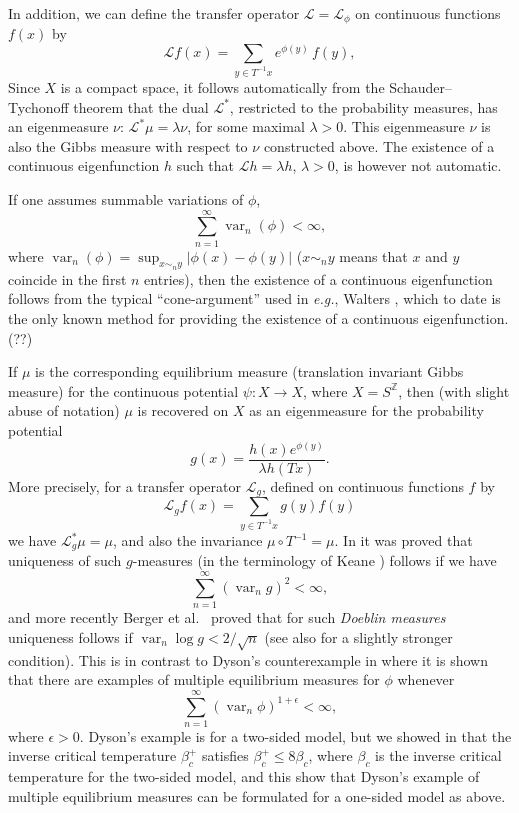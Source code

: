 \documentclass[11pt, a4paper]{amsart}
\theoremstyle{definition}
\theoremstyle{remark}
\providecommand{\mc}{\mathcal}
\providecommand{\opn}{\operatorname}
\providecommand{\var}{\opn{var}}
\def\X{X}
\begin{document}
In addition, we can define the transfer operator $\mc L=\mc L_\phi$ on
continuous functions $f(x)$ by
\begin{equation}\label{trans}
  {\mathcal L} f(x)= \sum_{y\in T^{-1}x} e^{\phi(y)}\, f(y),
\end{equation}
Since $\X$ is a compact space, it follows automatically from the
Schauder--Tychonoff theorem that the dual ${\mathcal L}^*$, restricted to the
probability measures, has an eigenmeasure $\nu$:
${\mathcal L}^* \mu=\lambda \nu$, for some maximal $\lambda>0$. This
eigenmeasure $\nu$ is also the Gibbs measure with respect to $\nu$ constructed
above. The existence of a continuous eigenfunction $h$ such that
${\mathcal L}h=\lambda h$, $\lambda>0$, is however not automatic.

If one assumes summable variations of $\phi$,
\begin{equation}\label{sum}
  \sum_{n=1}^\infty \var_n (\phi)<\infty,
\end{equation}
where $\var_n(\phi)=\sup_{x\sim_n y}|\phi(x)-\phi(y)|$ ($x\sim_n y$ means that
$x$ and $y$ coincide in the first $n$ entries), then the existence of a
continuous eigenfunction follows from the typical ``cone-argument'' used in {\em
  e.g.}, Walters \cite{walters1}, which to date is the only known method for
providing the existence of a continuous eigenfunction. (??)

If $\mu$ is the corresponding equilibrium measure (translation invariant Gibbs
measure) for the continuous potential $\psi:X\to X$, where $X=S^{\mathbb Z}$,
then (with slight abuse of notation) $\mu$ is recovered on $\X$ as an
eigenmeasure for the probability potential
\begin{equation}\label{g}
  g(x)= \frac{h(x) e^{\phi(y)}}{\lambda h(Tx)}.
\end{equation} 
More precisely, for a transfer operator ${\mathcal L}_g$, defined on continuous
functions $f$ by
\begin{equation} {\mathcal L}_g f(x)=\sum_{y\in T^{-1}x} g(y) f(y)
\end{equation}
we have ${\mathcal L}_g^*\mu=\mu$, and also the invariance
$\mu\circ T^{-1}=\mu$. In \cite{johob} it was proved that uniqueness of such
$g$-measures (in the terminology of Keane \cite{keane}) follows if we have
$$\sum_{n=1}^\infty (\var_n g)^2<\infty,$$
and more recently Berger et al.\ \cite{berger2} proved that for such {\em
  Doeblin measures} uniqueness follows if $\var_n \log g <2/\sqrt{n}$ (see also
\cite{johob3} for a slightly stronger condition). This is in contrast to Dyson's
counterexample in \cite{dyson} where it is shown that there are examples of
multiple equilibrium measures for $\phi$ whenever
$$\sum_{n=1}^\infty (\var_n \phi)^{1+\epsilon}<\infty,$$
where $\epsilon>0$. Dyson's example is for a two-sided model, but we showed in
\cite{johob4} that the inverse critical temperature $\beta_c^+$ satisfies
$\beta_c^+\leq 8\beta_c$, where $\beta_c$ is the inverse critical temperature
for the two-sided model, and this show that Dyson's example of multiple
equilibrium measures can be formulated for a one-sided model as above.
\end{document}
